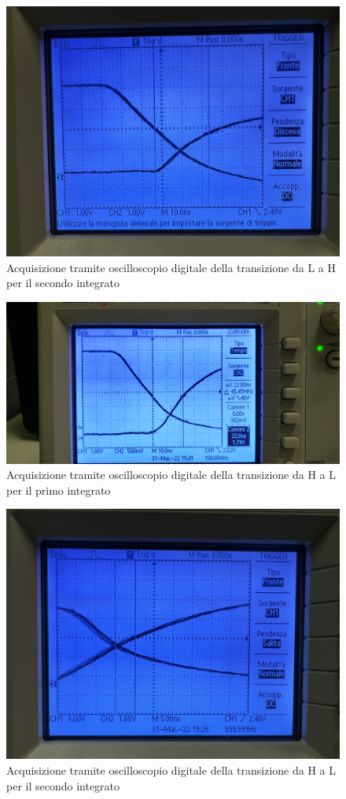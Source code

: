 \documentclass[10pt, a4paper, italian]{article}
\begin{document}
\begin{figure}
	\includegraphics[width=\textwidth]{LH2}
	\caption{Acquisizione tramite oscilloscopio digitale della transizione da L a H per il secondo integrato}
\end{figure}
\begin{figure}
	\includegraphics[width=\textwidth]{HL1}
	\caption{Acquisizione tramite oscilloscopio digitale della transizione da H a L per il primo integrato}
\end{figure}
\begin{figure}
	\includegraphics[width=\textwidth]{HL2}
	\caption{Acquisizione tramite oscilloscopio digitale della transizione da H a L per il secondo integrato}
\end{figure}
\end{document}
